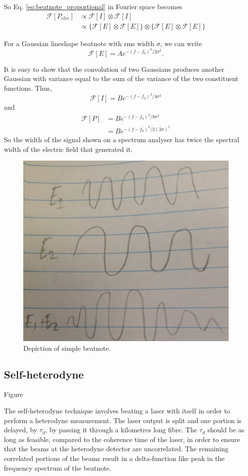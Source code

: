 So Eq. \ref{eq:beatnote_proportional} in Fourier space becomes
\begin{align}
\mathcal{F}[P_{elec}]&\propto \mathcal{F}[I]\otimes\mathcal{F}[I]\nonumber\\
&\propto \big\{\mathcal{F}[E] \otimes\mathcal{F}[E]\big\} \otimes\big\{\mathcal{F}[E] \otimes\mathcal{F}[E]\big\}
\end{align}

For a Gaussian lineshape beatnote with \gls{rms} width $\sigma$, we can write
\begin{equation}
\mathcal{F}[E] = A e^{-(f-f_0)^2/2\sigma^2}.
\end{equation}

It is easy to show that the convolution of two Gaussians produces another Gaussian with variance equal to the sum of the variance of the two constituent functions.
Thus,
\begin{equation}
\mathcal{F}[I] = B e^{-(f-f_0)^2/4\sigma^2}
\end{equation}
and
\begin{align}
\mathcal{F}[P] &= B e^{-(f-f_0)^2/8\sigma^2}\nonumber\\
&= B e^{-(f-f_0)^2/2(2\sigma)^2}
\end{align}
So the width of the signal shown on a spectrum analyser has twice the spectral width of the electric field that generated it.

\begin{figure}
\centering
\includegraphics[width=0.5\linewidth]{part1/Figs/beatnote.jpg}
\caption{Depiction of simple beatnote.}
\label{figure:simple_beatnote}
\end{figure}

\subsection{Self-heterodyne}
{\color{red}Figure}

The self-heterodyne technique involves beating a laser with itself in order to perform a heterodyne measurement\cite{okoshi_novel_1980, richter_linewidth_1986}.
The laser output is split and one portion is delayed, by $\tau_d$, by passing it through a kilometres long fibre.
The $\tau_d$ should be as long as feasible, compared to the coherence time of the laser, in order to ensure that the beams at the heterodyne detector are uncorrelated.
The remaining correlated portions of the beams result in a delta-function like peak in the frequency spectrum of the beatnote.

